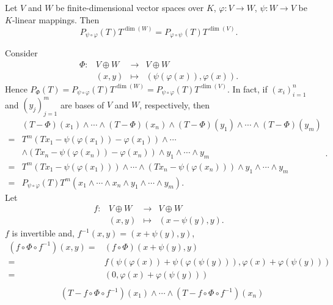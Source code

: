 \begin{theoremenv}
    Let $V$ and $W$ be finite-dimensional vector spaces over $K$,
    $\varphi : V \rightarrow W$, $\psi : W \rightarrow V$ be $K$-linear mappings.
    Then
    $$P_{\psi \circ \varphi}(T) T^{\dim(W)} = P_{\varphi\circ\psi}(T) T^{\dim(V)}.$$
\end{theoremenv}
\begin{proofenv}
    Consider
    $$\begin{array}{rrcl}
        \Phi : & V \oplus W & \longrightarrow & V \oplus W\\
        & (x,y) & \longmapsto & (\psi(\varphi(x)), \varphi(x)).
    \end{array}$$
    Hence $P_{\Phi}(T) = P_{\psi \circ \varphi}(T) T^{\dim(W)} = P_{\psi\circ\varphi}(T) T^{\dim(V)}$.
    In fact, if $(x_i)_{i = 1}^n$ and $(y_{j})_{j = 1}^m$ are bases of $V$ and $W$, respectively, then
    $$\begin{aligned}
        & (T - \Phi)(x_1)\wedge \cdots \wedge (T-\Phi)(x_n) \wedge (T-\Phi)(y_1)\wedge \cdots \wedge (T-\Phi)(y_m)\\
        = & T^m(Tx_1 - \psi(\varphi(x_1))- \varphi(x_1)) \wedge \cdots\\
        & \wedge (Tx_n - \psi(\varphi(x_n)) - \varphi(x_n)) \wedge y_1 \wedge \cdots \wedge y_m\\
        = & T^m(Tx_1 - \psi(\varphi(x_1))) \wedge \cdots \wedge (Tx_n - \psi(\varphi(x_n))) \wedge y_1 \wedge \cdots \wedge y_m\\
        = & P_{\psi \circ \varphi}(T) T^{m} (x_1 \wedge \cdots \wedge x_n \wedge y_1 \wedge \cdots \wedge y_m).
    \end{aligned}.$$
    Let
    $$\begin{array}{rrcl}
        f : & V \oplus W & \longrightarrow & V \oplus W\\
        & (x,y) & \longmapsto & (x - \psi(y), y).
    \end{array}$$
    $f$ is invertible and, $f^{-1}(x,y) = (x + \psi(y),y)$,
    $$\begin{aligned}
        (f \circ \Phi \circ f^{-1})(x,y) = & (f \circ \Phi)(x + \psi(y), y)\\
        = & f(\psi(\varphi(x)) + \psi(\varphi(\psi(y))), \varphi(x) + \varphi(\psi(y)))\\
        = & (0, \varphi(x) + \varphi(\psi(y)))\\
    \end{aligned}$$
    $$\begin{aligned}
        & (T - f \circ \Phi \circ f^{-1})(x_1) \wedge \cdots \wedge (T - f \circ \Phi \circ f^{-1})(x_n)\\

\end{aligned}$$
\end{proofenv}
